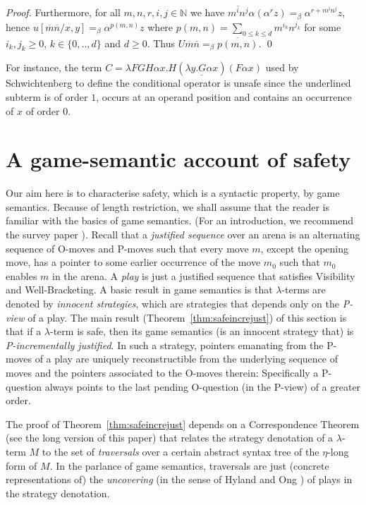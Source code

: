 \documentclass{llncs}
\newcommand{\encode}[1]{\overline{#1}} \newcommand\dps{\displaystyle}
\newcommand\nat{\mathbb{N}}
\begin{document}
\begin{proof}
Furthermore, for all $m,n,r,i,j\in \nat$
we have $\encode{m^i n^j} \alpha (\alpha^r z) =_\beta
\alpha^{r + m^i n^j} z$,
hence $u[\encode{m} \encode{n}/x,y] =_\beta \alpha^{p(m,n)} z$ where $p(m,n) = \sum_{0\leq k \leq d} m^{i_k} n^{j_k}$ for some $i_k,j_k \geq 0$, $k \in\{ 0,..,d \}$ and $d\geq 0$.
Thus $U \encode{m} \encode{n} =_\beta \encode{p(m,n)}$. \qed
\end{proof}

For instance, the term $ C = \lambda F G H \alpha x . H (
\underline{\lambda y . G \alpha x} ) (F \alpha x)$ used by
Schwichtenberg \cite{citeulike:622637} to define the conditional
operator is unsafe since the underlined subterm is of order $1$,
occurs at an operand position and contains an occurrence of $x$ of
order $0$.


\section{A game-semantic account of safety}
\label{sec:gamesemaccount}
Our aim here is to characterise safety, which is a syntactic property,
by game semantics. Because of length restriction, we shall assume that
the reader is familiar with the basics of game semantics.  (For an
introduction, we recommend the survey paper
\cite{abramsky:game-semantics-tutorial}). Recall that a \emph{justified sequence} over
an arena is an alternating sequence of O-moves and P-moves such that
every move $m$, except the opening move, has a pointer to some earlier
occurrence of the move $m_0$ such that $m_0$ enables $m$ in the
arena. A \emph{play} is just a justified sequence that satisfies
Visibility and Well-Bracketing. A basic result in game semantics is
that $\lambda$-terms are denoted by \emph{innocent strategies}, which
are strategies that depends only on the \emph{P-view} of a play. The
main result (Theorem~\ref{thm:safeincrejust}) of this section is that
if a $\lambda$-term is safe, then its game semantics (is an innocent
strategy that) is \emph{P-incrementally justified}. In such a
strategy, pointers emanating from the P-moves of a play are uniquely
reconstructible from the underlying sequence of moves and the pointers
associated to the O-moves therein: Specifically a P-question always
points to the last pending O-question (in the P-view) of a greater
order.

The proof of Theorem~\ref{thm:safeincrejust} depends on a
Correspondence Theorem (see the long version of this paper) that relates the strategy denotation of a $\lambda$-term $M$
to the set of \emph{traversals} over a certain abstract syntax tree of
the $\eta$-long form of $M$. In the parlance of game semantics,
traversals are just (concrete representations of) the
\emph{uncovering} (in the sense of Hyland and Ong
\cite{hylandong_pcf}) of plays in the strategy denotation.
\end{document}
